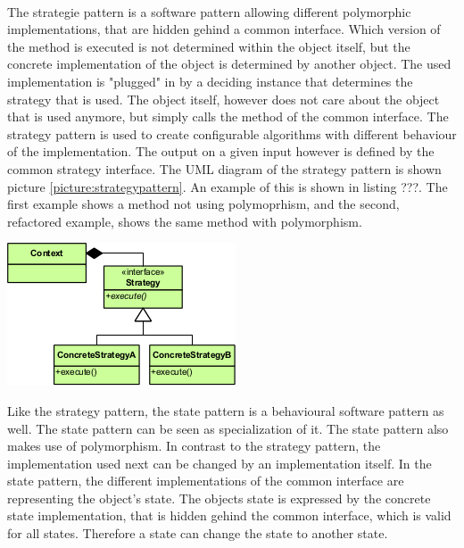 \\
The strategie pattern is a software pattern allowing different polymorphic implementations, that are hidden gehind a common interface. Which version of the method is executed is not determined within the object itself, but the concrete implementation of the object is determined by another object. The used implementation is "plugged" in by a deciding instance that determines the strategy that is used. The object itself, however does not care about the object that is used anymore, but simply calls the method of the common interface. The strategy pattern is used to create configurable algorithms with different behaviour of the implementation\cite[p. 349]{gof}. The output on a given input however is defined by the common strategy interface. The \acf{UML} diagram of the strategy pattern is shown picture \ref{picture:strategypattern}. An example of this is shown in listing ???. The first example shows a method not using polymoprhism, and the second, refactored example, shows the same method with polymorphism.

\includegraphics{Bilder/StrategyPattern}
\label{picture:strategypattern}


Like the strategy pattern, the state pattern is a behavioural software pattern as well. The state pattern can be seen as specialization of it. The state pattern also makes use of polymorphism. In contrast to the strategy pattern, the implementation used next can be changed by an implementation itself. In the state pattern, the different implementations of the common interface are representing the object's state. The objects state is expressed by the concrete state implementation, that is hidden gehind the common interface, which is valid for all states. Therefore a state can change the state to another state.\\

